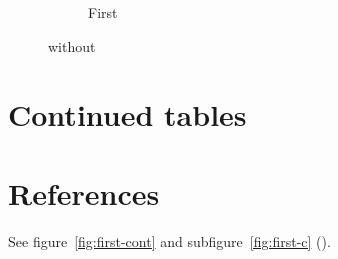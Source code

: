 \documentclass{article}
\newcommand\SCLsub[3][]{%
  \begin{subfigure}{.3\linewidth}
    \centering\SCLimage{2cm}{1cm}
    \caption{#2}#3%
  \end{subfigure}\hfill}
\begin{document}
\begin{figure}[htbp]
  \setcounter{subfigure}{2}%
  \centering
  \SCLsub{First}{}
  \caption{\texttt{\string\setcounter} without
    \texttt{\string\ContinuedFloat}}
\end{figure}

\section*{Continued tables}

\begin{table}[htbp]
  \centering
  \caption{Table}
  \hfill
\end{table}

\begin{table}[htbp]
  \ContinuedFloat
  \centering
  \caption{Table (continued)}
  \hfill
\end{table}

\begin{table}[htbp]
  \centering
  \caption{Next table}
\end{table}

\section*{References}

See figure~\ref{fig:first-cont} and subfigure~\ref{fig:first-c}
().
\end{document}
